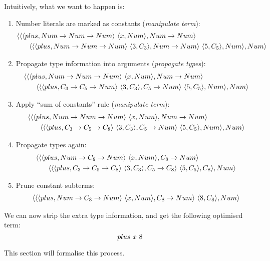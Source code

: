 \documentclass[main.tex]{subfiles}
\begin{document}
\begin{example}
    Intuitively, what we want to happen is:
    \begin{enumerate}
        \item Number literals are marked as constants (\emph{manipulate term}):
            \begin{align*}
                \langle \langle &\langle plus, Num \rightarrow Num \rightarrow Num \rangle \text{ }
                \langle x, Num \rangle, Num \rightarrow Num \rangle \text{ } \\
                        &\quad \langle \langle \langle plus, Num \rightarrow Num \rightarrow Num \rangle \text{ } \langle 3, C_3 \rangle, Num \rightarrow Num \rangle \text{ }
                        \langle 5, C_5 \rangle, Num \rangle, Num \rangle
            \end{align*}
        \item Propagate type information into arguments (\emph{propagate types}):
            \begin{align*}
                \langle \langle &\langle plus, Num \rightarrow Num \rightarrow Num \rangle \text{ }
                \langle x, Num \rangle, Num \rightarrow Num \rangle \text{ } \\
                        &\quad \langle \langle \langle plus, C_3 \rightarrow C_5 \rightarrow Num \rangle \text{ } \langle 3, C_3 \rangle, C_5 \rightarrow Num \rangle \text{ }
                        \langle 5, C_5 \rangle, Num \rangle, Num \rangle
            \end{align*}
        \item Apply ``sum of constants'' rule (\emph{manipulate term}):
            \begin{align*}
                \langle \langle &\langle plus, Num \rightarrow Num \rightarrow Num \rangle \text{ }
                \langle x, Num \rangle, Num \rightarrow Num \rangle \text{ } \\
                        &\quad \langle \langle \langle plus, C_3 \rightarrow C_5 \rightarrow C_8 \rangle \text{ } \langle 3, C_3 \rangle, C_5 \rightarrow Num \rangle \text{ }
                        \langle 5, C_5 \rangle, Num \rangle, Num \rangle
            \end{align*}
        \item Propagate types again:
            \begin{align*}
                \langle \langle &\langle plus, Num \rightarrow C_8 \rightarrow Num \rangle \text{ }
                \langle x, Num \rangle, C_8 \rightarrow Num \rangle \text{ } \\
                        &\quad \langle \langle \langle plus, C_3 \rightarrow C_5 \rightarrow C_8 \rangle \text{ } \langle 3, C_3 \rangle, C_5 \rightarrow C_8 \rangle \text{ }
                        \langle 5, C_5 \rangle, C_8 \rangle, Num \rangle
            \end{align*}
        \item Prune constant subterms:
            \begin{align*}
                \langle \langle &\langle plus, Num \rightarrow C_8 \rightarrow Num \rangle \text{ }
                \langle x, Num \rangle, C_8 \rightarrow Num \rangle \text{ }
                        \langle 8, C_8 \rangle, Num \rangle \\
            \end{align*}
    \end{enumerate}

    We can now strip the extra type information, and get the following
    optimised term:
    \[ plus \text{ } x \text{ } 8 \]

    This section will formalise this process.
\end{example}
\end{document}
